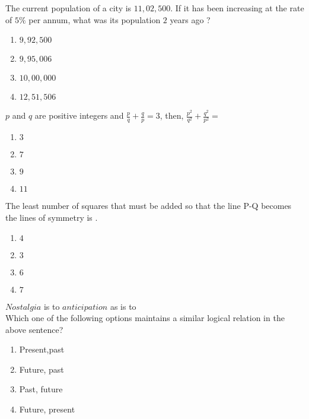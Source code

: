 \iffalse
\chapter{2021}
\section{st}
\author{AI24BTECH11023 - Tarun Reddy Pakala}
\fi
\item The current population of a city is $11,02,500$. If it has been increasing at the rate of $5\%$ per annum, what was its population $2$ years ago ?
\begin{enumerate}
    \item $9,92,500$
    \item $9,95,006$
    \item $10,00,000$
    \item $12,51,506$
\end{enumerate}
\item $p$ and $q$ are positive integers and $\frac{p}{q}+\frac{q}{p}=3$, then, $\frac{p^2}{q^2}+\frac{q^2}{p^2}=$
\begin{enumerate}
    \item $3$
    \item $7$
    \item $9$
    \item $11$
\end{enumerate}
\item The least number of squares that must be added so that the line P-Q becomes the lines of symmetry is \underline{\hspace{2cm}}.

\begin{enumerate}
    \item $4$
    \item $3$
    \item $6$
    \item $7$
\end{enumerate}
\item $Nostalgia$ is to $anticipation$ as \underline{\hspace{2cm}} is to \underline{\hspace{2cm}}\\ Which one of the following options maintains a similar logical relation in the above sentence?
\begin{enumerate}
    \item Present,past 
    \item Future, past
    \item Past, future
    \item Future, present
\end{enumerate}
